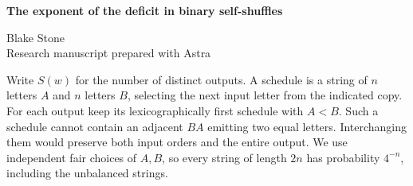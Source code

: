 \documentclass[11pt,letterpaper]{article}
\begin{document}
\thispagestyle{plain}
\begin{center}
{\LARGE\bfseries The exponent of the deficit in binary self-shuffles\par}
\vspace{0.5em}
Blake Stone\\
{\small Research manuscript prepared with Astra}
\end{center}

\begin{abstract}
Let \(M_n\) be the largest number of distinct words produced by interleaving two copies of a length-\(n\) binary word. We prove \(M_n\le4^n\exp(-c n^{1/3})\). Together with a lower construction this identifies the exponent of \(\log(4^n/M_n)\) as \(1/3\). In every maximizing input the number of constant runs is \(n^{1/3+o(1)}\) and the longest run has length \(n^{2/3+o(1)}\).
\end{abstract}

Write \(S(w)\) for the number of distinct outputs. A schedule is a string of \(n\) letters \(A\) and \(n\) letters \(B\), selecting the next input letter from the indicated copy. For each output keep its lexicographically first schedule with \(A<B\). Such a schedule cannot contain an adjacent \(BA\) emitting two equal letters. Interchanging them would preserve both input orders and the entire output. We use independent fair choices of \(A,B\), so every string of length \(2n\) has probability \(4^{-n}\), including the unbalanced strings.
\end{document}
